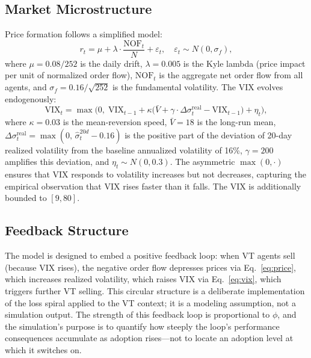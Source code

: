 \documentclass[12pt,a4paper]{article}
\begin{document}
\subsection{Market Microstructure}

Price formation follows a simplified \citet{kyle1985} model:
\begin{equation}
  r_t = \mu + \lambda \cdot \frac{\text{NOF}_t}{N} + \varepsilon_t, \quad \varepsilon_t \sim N(0, \sigma_f),
  \label{eq:price}
\end{equation}
where $\mu = 0.08/252$ is the daily drift, $\lambda = 0.005$ is the Kyle lambda (price impact per unit of normalized order flow), $\text{NOF}_t$ is the aggregate net order flow from all agents, and $\sigma_f = 0.16/\sqrt{252}$ is the fundamental volatility. The VIX evolves endogenously:
\begin{equation}
  \text{VIX}_t = \max\!\Big(0,\; \text{VIX}_{t-1} + \kappa\big(\bar{V} + \gamma \cdot \Delta\sigma^{\text{real}}_t - \text{VIX}_{t-1}\big) + \eta_t\Big),
  \label{eq:vix}
\end{equation}
where $\kappa = 0.03$ is the mean-reversion speed, $\bar{V} = 18$ is the long-run mean, $\Delta\sigma^{\text{real}}_t = \max(0,\, \hat{\sigma}^{20d}_t - 0.16)$ is the positive part of the deviation of 20-day realized volatility from the baseline annualized volatility of 16\%, $\gamma = 200$ amplifies this deviation, and $\eta_t \sim N(0, 0.3)$. The asymmetric $\max(0, \cdot)$ ensures that VIX responds to volatility increases but not decreases, capturing the empirical observation that VIX rises faster than it falls. The VIX is additionally bounded to $[9, 80]$.

\subsection{Feedback Structure}

The model is designed to embed a positive feedback loop: when VT agents sell (because VIX rises), the negative order flow depresses prices via Eq.~\eqref{eq:price}, which increases realized volatility, which raises VIX via Eq.~\eqref{eq:vix}, which triggers further VT selling. This circular structure is a deliberate implementation of the \citet{brunnermeier2009} loss spiral applied to the VT context; it is a modeling assumption, not a simulation output. The strength of this feedback loop is proportional to $\phi$, and the simulation's purpose is to quantify how steeply the loop's performance consequences accumulate as adoption rises---not to locate an adoption level at which it switches on.
\end{document}
